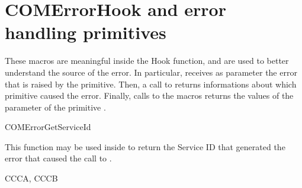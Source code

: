 
\section{COMErrorHook and error handling primitives}
\label{sec:errorhook-macros}
These macros are meaningful inside the  Hook
function, and are used to better understand the source of the
error. In particular,  receives as parameter the
error that is raised by the primitive. Then, a call to
 returns informations about which
primitive caused the error. Finally, calls to the macros
 returns the values of the  parameter
of the primitive .


\begin{function_nopb2}{COMErrorGetServiceId}
  \begin{fundescription}
    This function may be used inside  to return the
    Service ID that generated the error that caused the call to
    . 
  \end{fundescription}
  \begin{funreturn}
  \end{funreturn}
  \begin{funconformance}
    CCCA, CCCB
  \end{funconformance}
\end{function_nopb2}



